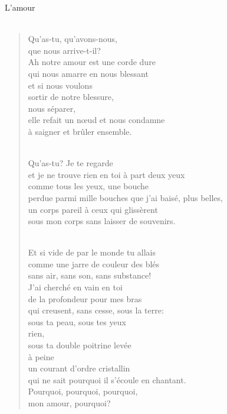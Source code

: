 \documentclass[11pt,a4paper]{book}
\begin{document}
\cleardoublepage

{\huge L'amour} \\ \\

\begin{verse}
Qu'as-tu, qu'avons-nous, \\
que nous arrive-t-il? \\
Ah notre amour est une corde dure \\
qui nous amarre en nous blessant \\
et si nous voulons \\
sortir de notre blessure, \\
nous séparer, \\
elle refait un n{\oe}ud et nous condamne \\
à saigner et brûler ensemble. \\ \

Qu'as-tu? Je te regarde \\
et je ne trouve rien en toi à part deux yeux \\
comme tous les yeux, une bouche \\
perdue parmi mille bouches que j'ai baisé, plus belles, \\
un corps pareil à ceux qui glissèrent \\
sous mon corps sans laisser de souvenirs. \\ \

Et si vide de par le monde tu allais \\
comme une jarre de couleur des blés \\
sans air, sans son, sans substance! \\
J'ai cherché en vain en toi \\
de la profondeur pour mes bras \\
qui creusent, sans cesse, sous la terre: \\
sous ta peau, sous tes yeux \\
rien, \\
sous ta double poitrine levée \\
à peine \\
un courant d'ordre cristallin \\
qui ne sait pourquoi il s'écoule en chantant. \\
Pourquoi, pourquoi, pourquoi, \\
mon amour, pourquoi?
\end{verse}

\newpage
\end{document}
